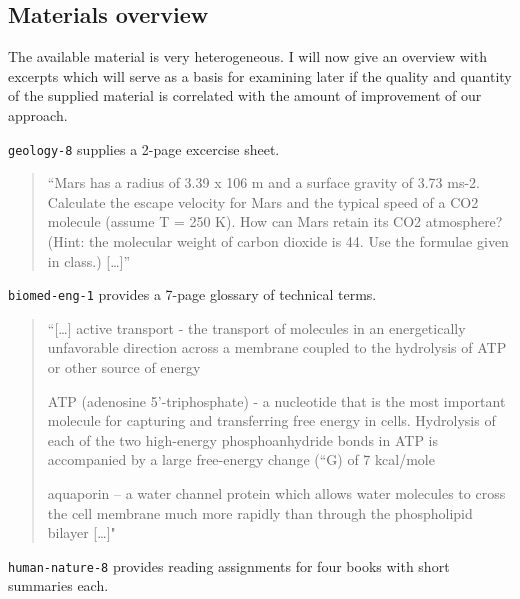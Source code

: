 \documentclass[]{article}
\begin{document}
\subsection{Materials overview}\label{materials-overview}

The available material is very heterogeneous. I will now give an
overview with excerpts which will serve as a basis for examining later
if the quality and quantity of the supplied material is correlated with
the amount of improvement of our approach.

\texttt{geology-8} supplies a 2-page excercise sheet.

\begin{quote}
``Mars has a radius of 3.39 x 106 m and a surface gravity of 3.73 ms-2.
Calculate the escape velocity for Mars and the typical speed of a CO2
molecule (assume T = 250 K). How can Mars retain its CO2 atmosphere?
(Hint: the molecular weight of carbon dioxide is 44. Use the formulae
given in class.) {[}\ldots{}{]}''
\end{quote}

\texttt{biomed-eng-1} provides a 7-page glossary of technical terms.

\begin{quote}
``{[}\ldots{}{]} active transport - the transport of molecules in an
energetically unfavorable direction across a membrane coupled to the
hydrolysis of ATP or other source of energy

ATP (adenosine 5'-triphosphate) - a nucleotide that is the most
important molecule for capturing and transferring free energy in cells.
Hydrolysis of each of the two high-energy phosphoanhydride bonds in ATP
is accompanied by a large free-energy change (``G) of 7 kcal/mole

aquaporin -- a water channel protein which allows water molecules to
cross the cell membrane much more rapidly than through the phospholipid
bilayer {[}\ldots{}{]}"
\end{quote}

\texttt{human-nature-8} provides reading assignments for four books with
short summaries each.
\end{document}
